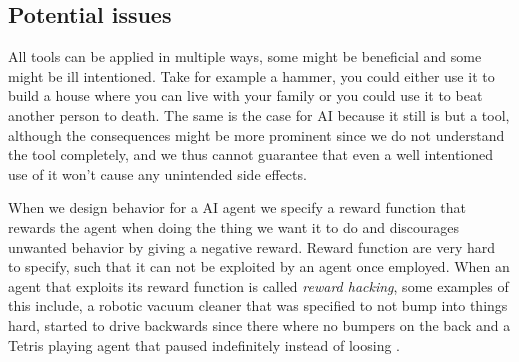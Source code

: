 \documentclass[12pt,A4]{report}
\theoremstyle{definition}
\begin{document}


\subsection{Potential issues}
All tools can be applied in multiple ways, some might be beneficial and some might be ill intentioned. Take for example a hammer, you could either use it to build a house where you can live with your family or you could use it to beat another person to death. The same is the case for AI because it still is but a tool, although the consequences might be more prominent since we do not understand the tool completely, and we thus cannot guarantee that even a well intentioned use of it won't cause any unintended side effects. 

When we design behavior for a AI agent we specify a reward function that rewards the agent when doing the thing we want it to do and discourages unwanted behavior by giving a negative reward. Reward function are very hard to specify, such that it can not be exploited by an agent once employed. When an agent that exploits its reward function is called \textit{reward hacking}, some examples of this include, a robotic vacuum cleaner that was specified to not bump into things hard, started to drive backwards since there where no bumpers on the back\autocite{Custard Smingleigh} and a Tetris playing agent that paused indefinitely instead of loosing \autocite{Dr. Tom Murphy}. 

\end{document}
